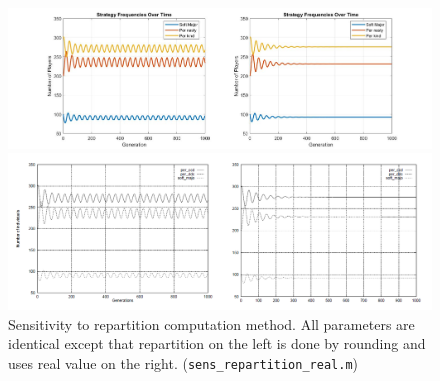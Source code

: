 \begin{figure}[ht!]
	\centering
	\begin{minipage}{1\textwidth}
		\includegraphics[width=1\linewidth]{fit_plots_theoretical/repartition_real}
		
		
	\end{minipage}
	\begin{minipage}{1\textwidth}
		\includegraphics[width=1\linewidth]{sens_real}
	\end{minipage}
	\caption{Sensitivity to repartition computation method. All parameters are identical
		except that repartition on the left is done by rounding and uses real value on the right. (\texttt{sens\_repartition\_real.m})}
\end{figure}

